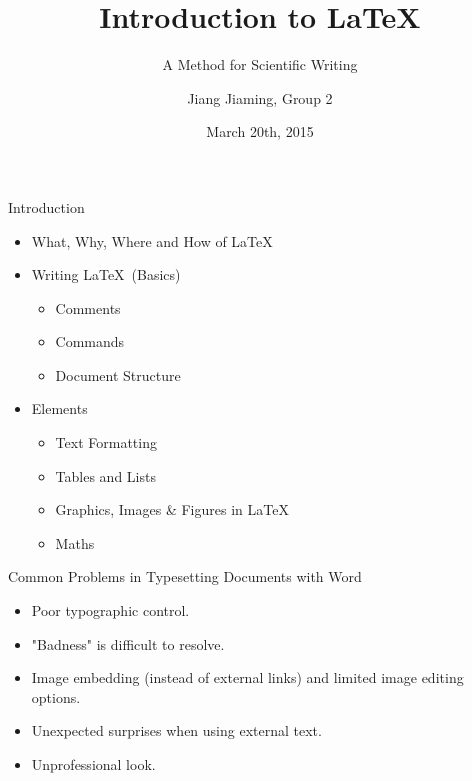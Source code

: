 \documentclass[mathserif]{beamer}
\title{Introduction to \LaTeX}
\subtitle{A Method for Scientific Writing}
\author[Jiang Jiaming]{Jiang Jiaming, Group 2}
\institute[SKLSE]{State Key Laboratory of Software Engineering, Wuhan University}
\date[20/03/15]{March 20th, 2015}
\begin{document}
\begin{frame}[plain]
	\titlepage
\end{frame}
	

\begin{frame}{Introduction}

\vfill
\begin{itemize}
	\item What, Why, Where and How of \LaTeX
	\item Writing \LaTeX\ (Basics)
        \begin{itemize}
        	\item Comments
        	\item Commands
            \item Document Structure
        \end{itemize}
	\item Elements
        \begin{itemize}
        	\item Text Formatting
        	\item Tables and Lists
        	\item Graphics, Images \& Figures in \LaTeX
        	\item Maths
        \end{itemize}
\end{itemize}
\vfill
\end{frame}

\begin{frame}{Common Problems in Typesetting Documents with Word}

\begin{itemize}
	\item Poor typographic control.
	\item "Badness" is difficult to resolve.
	\item Image embedding (instead of external links) and limited image editing
options.
	\item Unexpected surprises when using external text.
	\item Unprofessional look.
\end{itemize}

\end{frame}
\end{document}

